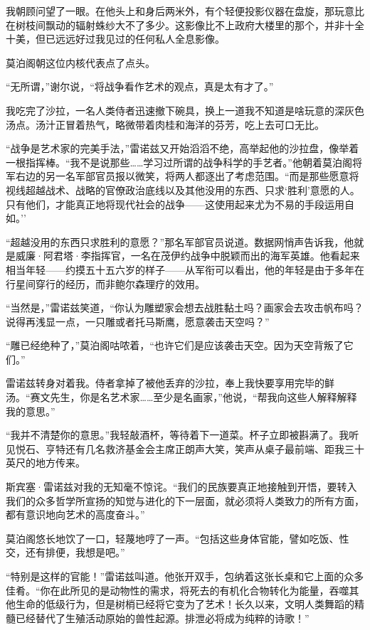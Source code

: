 \documentclass[AutoFakeBold=true]{book}
\begin{document}
我朝顾问望了一眼。在他头上和身后两米外，有个轻便投影仪器在盘旋，那玩意比在树枝间飘动的辐射蛛纱大不了多少。这影像比不上政府大楼里的那个，并非十全十美，但已远远好过我见过的任何私人全息影像。

莫泊阁朝这位内核代表点了点头。

``无所谓，''谢尔说，``将战争看作艺术的{\kaishu 观点}，真是太有才了。''

我吃完了沙拉，一名人类侍者迅速撤下碗具，换上一道我不知道是啥玩意的深灰色汤点。汤汁正冒着热气，略微带着肉桂和海洋的芬芳，吃上去可口无比。

``战争是艺术家的完美手法，''雷诺兹又开始滔滔不绝，高举起他的沙拉盘，像举着一根指挥棒。``我不是说那些……学习过所谓的战争科学的手艺者。''他朝着莫泊阁将军右边的另一名军部官员报以微笑，将两人都逐出了考虑范围。``而是那些愿意将视线超越战术、战略的官僚政治底线以及其他没用的东西、只求`胜利'意愿的人。只有他们，才能真正地将现代社会的战争——这使用起来尤为不易的手段运用自如。''

``{\kaishu 超越没用的东西}只求胜利的意愿？''那名军部官员说道。数据网悄声告诉我，他就是威廉·阿君塔·李指挥官，一名在茂伊约战争中脱颖而出的海军英雄。他看起来相当年轻——约摸五十五六岁的样子——从军衔可以看出，他的年轻是由于多年在行星间穿行的经历，而非鲍尔森理疗的效用。

``当然是，''雷诺兹笑道，``你认为雕塑家会想去{\kaishu 战胜}黏土吗？画家会去攻击帆布吗？说得再浅显一点，一只雕或者托马斯鹰，愿意袭击天空吗？''

``雕已经绝种了，''莫泊阁咕哝着，``也许它们是{\kaishu 应该}袭击天空。因为天空背叛了它们。''

雷诺兹转身对着我。侍者拿掉了被他丢弃的沙拉，奉上我快要享用完毕的鲜汤。``赛文先生，你是名艺术家……至少是名画家，''他说，``帮我向这些人解释解释我的意思。''

``我并不清楚你的意思。''我轻敲酒杯，等待着下一道菜。杯子立即被斟满了。我听见悦石、亨特还有几名救济基金会主席正朗声大笑，笑声从桌子最前端、距我三十英尺的地方传来。

斯宾塞·雷诺兹对我的无知毫不惊诧。``我们的民族要真正地接触到开悟，要转入我们的众多哲学所宣扬的知觉与进化的下一层面，就必须将人类致力的{\kaishu 所有}方面，都有意识地向艺术的高度奋斗。''

莫泊阁悠长地饮了一口，轻蔑地哼了一声。``包括这些身体官能，譬如吃饭、性交，还有排便，我想是吧。''

``{\kaishu 特别}是这样的官能！''雷诺兹叫道。他张开双手，包纳着这张长桌和它上面的众多佳肴。``你在此所见的是动物性的需求，将死去的有机化合物转化为能量，吞噬其他生命的低级行为，但是树梢已经将它变为了艺术！长久以来，文明人类舞蹈的精髓已经替代了生殖活动原始的兽性起源。排泄必将成为纯粹的诗歌！''
\end{document}
